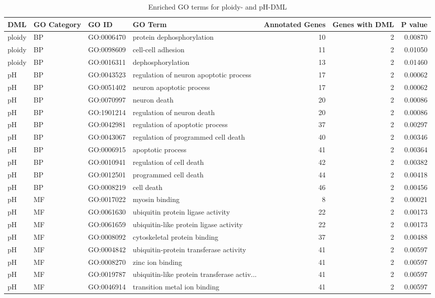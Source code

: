 \documentclass [11pt, proquest] {uwthesis}[2015/03/03]
\begin{document}
\begingroup\fontsize{6}{8}\selectfont
\begin{longtable}[t]{llllrrr}
\caption{\label{tab:enrichedterms}Enriched GO terms for ploidy- and pH-DML}\\
\toprule
DML & GO Category & GO ID & GO Term & Annotated Genes & Genes with DML & P value\\
\midrule
ploidy & BP & GO:0006470 & protein dephosphorylation & 10 & 2 & 0.00870\\
ploidy & BP & GO:0098609 & cell-cell adhesion & 11 & 2 & 0.01050\\
ploidy & BP & GO:0016311 & dephosphorylation & 13 & 2 & 0.01460\\
pH & BP & GO:0043523 & regulation of neuron apoptotic process & 17 & 2 & 0.00062\\
pH & BP & GO:0051402 & neuron apoptotic process & 17 & 2 & 0.00062\\
\addlinespace
pH & BP & GO:0070997 & neuron death & 20 & 2 & 0.00086\\
pH & BP & GO:1901214 & regulation of neuron death & 20 & 2 & 0.00086\\
pH & BP & GO:0042981 & regulation of apoptotic process & 37 & 2 & 0.00297\\
pH & BP & GO:0043067 & regulation of programmed cell death & 40 & 2 & 0.00346\\
pH & BP & GO:0006915 & apoptotic process & 41 & 2 & 0.00364\\
\addlinespace
pH & BP & GO:0010941 & regulation of cell death & 42 & 2 & 0.00382\\
pH & BP & GO:0012501 & programmed cell death & 44 & 2 & 0.00418\\
pH & BP & GO:0008219 & cell death & 46 & 2 & 0.00456\\
pH & MF & GO:0017022 & myosin binding & 8 & 2 & 0.00021\\
pH & MF & GO:0061630 & ubiquitin protein ligase activity & 22 & 2 & 0.00173\\
\addlinespace
pH & MF & GO:0061659 & ubiquitin-like protein ligase activity & 22 & 2 & 0.00173\\
pH & MF & GO:0008092 & cytoskeletal protein binding & 37 & 2 & 0.00488\\
pH & MF & GO:0004842 & ubiquitin-protein transferase activity & 41 & 2 & 0.00597\\
pH & MF & GO:0008270 & zinc ion binding & 41 & 2 & 0.00597\\
pH & MF & GO:0019787 & ubiquitin-like protein transferase activ... & 41 & 2 & 0.00597\\
\addlinespace
pH & MF & GO:0046914 & transition metal ion binding & 41 & 2 & 0.00597\\
\bottomrule
\end{longtable}
\endgroup{}
\end{document}
